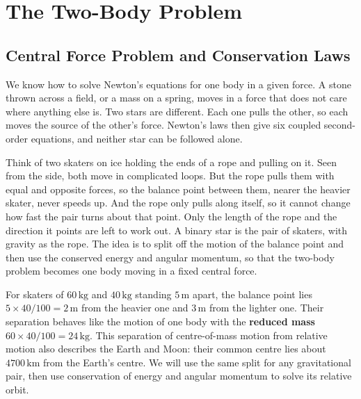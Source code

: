 \chapter{The Two-Body Problem}
\label{ch:twobody}


	
\section{Central Force Problem and Conservation Laws}
\label{tb:sec:central}

We know how to solve Newton's equations for one body in a given force. A stone thrown across a field, or a mass on a spring, moves in a force that does not care where anything else is. Two stars are different. Each one pulls the other, so each moves the source of the other's force. Newton's laws then give six coupled second-order equations, and neither star can be followed alone.

Think of two skaters on ice holding the ends of a rope and pulling on it. Seen from the side, both move in complicated loops. But the rope pulls them with equal and opposite forces, so the balance point between them, nearer the heavier skater, never speeds up. And the rope only pulls along itself, so it cannot change how fast the pair turns about that point. Only the length of the rope and the direction it points are left to work out. A binary star is the pair of skaters, with gravity as the rope. The idea is to split off the motion of the balance point and then use the conserved energy and angular momentum, so that the two-body problem becomes one body moving in a fixed central force.

For skaters of $60\,\mathrm{kg}$ and $40\,\mathrm{kg}$ standing $5\,\mathrm m$ apart, the balance point lies $5\times40/100=2\,\mathrm m$ from the heavier one and $3\,\mathrm m$ from the lighter one. Their separation behaves like the motion of one body with the \textbf{reduced mass} $60\times40/100=24\,\mathrm{kg}$. This separation of centre-of-mass motion from relative motion also describes the Earth and Moon: their common centre lies about $4700\,\mathrm{km}$ from the Earth's centre. We will use the same split for any gravitational pair, then use conservation of energy and angular momentum to solve its relative orbit.

